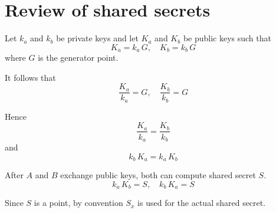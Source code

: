 \documentclass[12pt]{article}
\begin{document}
\section*{Review of shared secrets}

Let $k_a$ and $k_b$ be private keys and let $K_a$ and $K_b$ be public keys such that
\begin{equation*}
K_a=k_a\,G,\quad K_b=k_b\,G
\end{equation*}
where $G$ is the generator point.

\bigskip
It follows that
\begin{equation*}
\frac{K_a}{k_a}=G,\quad \frac{K_b}{k_b}=G
\end{equation*}

Hence
\begin{equation*}
\frac{K_a}{k_a}=\frac{K_b}{k_b}
\end{equation*}
and
\begin{equation*}
k_b\,K_a=k_a\,K_b
\end{equation*}

After $A$ and $B$ exchange public keys, both can compute shared secret $S$.
\begin{equation*}
k_a\,K_b=S,\quad k_b\,K_a=S
\end{equation*}

Since $S$ is a point, by convention $S_x$ is used for the actual shared secret.
\end{document}
